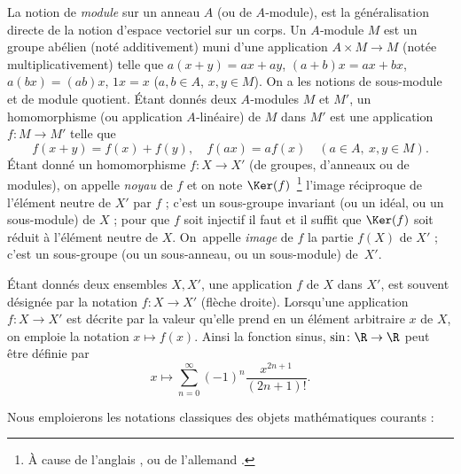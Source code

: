 \documentclass[11pt, useosf,
  title in boldface,
  theorem in new line,
  theorem numbering = section,
  number theorems separately,
]{simplivre}
\begin{document}
    La notion de \emph{module} sur un anneau \( A \) (ou de \( A \)‑module), est la généralisation directe de la notion d'espace vectoriel sur un corps. Un \( A \)‑module \( M \) est un groupe abélien (noté additivement) muni d'une application \( A \times M \to M \) (notée multiplicativement) telle que \( a(x+y) = ax + ay \), \( (a+b)x = ax+bx \), \( a(bx) = (ab)x \), \( 1 x = x \) (\( a,b \in A \), \( x,y \in M \)). On a les notions de sous-module et de module quotient. Étant donnés deux \( A \)‑modules \( M \) et \( M' \), un homomorphisme (ou application \( A \)‑linéaire) de \( M \) dans \( M' \) est une application \( f \colon M \to M' \) telle que
    \[
        f(x+y) = f(x)+f(y), \quad f(ax) = af(x) \quad (a \in A, ~ x,y \in M).
    \]
    Étant donné un homomorphisme \( f \colon X \to X' \) (de groupes, d'anneaux ou de modules), on appelle \emph{noyau} de \( f \) et on note \( \Ker(f) \)~\footnote{À cause de l'anglais , ou de l'allemand .} l'image réciproque de l'élément neutre de \( X' \) par \( f \) ; c'est un sous-groupe invariant (ou un idéal, ou un sous-module) de \( X \) ; pour que \( f \) soit injectif il faut et il suffit que \( \Ker(f) \) soit réduit à l'élément neutre de \( X \). On~appelle \emph{image} de \( f \) la partie \( f(X) \) de \( X' \) ; c'est un sous-groupe (ou un sous-anneau, ou un sous-module) de~\( X' \).

\enlargethispage*{\baselineskip}
    Étant donnés deux ensembles \( X, X' \), une application \( f \) de \( X \) dans \( X' \), est souvent désignée par la notation \( f \colon X \to X' \) (flèche droite). Lorsqu'une application \( f \colon X \to X' \) est décrite par la valeur qu'elle prend en un élément arbitraire \( x \) de \( X \), on emploie la notation \( x \mapsto f(x) \). Ainsi la fonction sinus, \( \sin \colon \R \to \R \) peut être définie par
    \[
        x \mapsto \sum_{n=0}^{\infty} (-1)^n \frac{x^{2n+1}}{(2n+1)!}.
    \]

    Nous emploierons les notations classiques des objets mathématiques courants :
\end{document}

